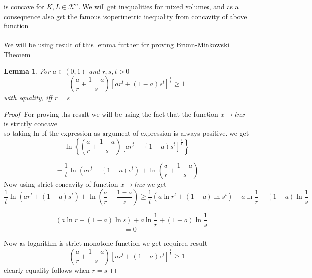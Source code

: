 \documentclass[oneside]{book}
\newtheorem{lemma}[theorem]{Lemma}
\theoremstyle{definition}
\begin{document}
 is concave for $ K, L \in \mathcal{K}^n $.
We will get inequalities for mixed volumes, and as a consequence also get the famous isoperimetric inequality from concavity of above function
\\\\
We will be using result of this lemma further for proving Brunn-Minkowski Theorem
\begin{lemma} 

For $a \in(0,1)$ and $r, s, t>0$
\[
\left(\frac{a}{r}+\frac{1-a}{s}\right)\left[a r^{t}+(1-a) s^{t}\right]^{\frac{1}{t}} \geq 1
\]
with equality, iff $r=s$
\end{lemma} 
 \begin{proof}
 
 For proving ths result we will be using the fact that the function $x \rightarrow lnx $ is strictly concave \\
 so taking ln of the expression as argument of expression is always positive. we get 
 $$\ln \left\{\left(\frac{a}{r}+\frac{1-a}{s}\right)\left[a r^{t}+(1-a) s^{t}\right]^{\frac{1}{t}}\right\}$$
 
$$ =\frac{1}{t} \ln \left(a r^{t}+(1-a) s^{t}\right)+\ln \left(\frac{a}{r}+\frac{1-a}{s}\right)$$
Now using strict concavity of  function  $x \rightarrow lnx $ we get 
$$\frac{1}{t} \ln \left(a r^{t}+(1-a) s^{t}\right)+\ln \left(\frac{a}{r}+\frac{1-a}{s}\right)
  \geq \frac{1}{t}\left(a \ln r^{t}+(1-a) \ln s^{t}\right)+a \ln \frac{1}{r}+(1-a) \ln \frac{1}{s}$$
  
  
$$ =  \left(a \ln r+(1-a) \ln s\right)+a \ln \frac{1}{r}+(1-a) \ln \frac{1}{s}$$
$$\quad = 0$$
 
 Now as logarithm is strict monotone function we get required result 
 \[
\left(\frac{a}{r}+\frac{1-a}{s}\right)\left[a r^{t}+(1-a) s^{t}\right]^{\frac{1}{t}} \geq 1
\]
 clearly equality follows when $r = s $
 \end{proof}
 
 
 
 
 
\end{document}
